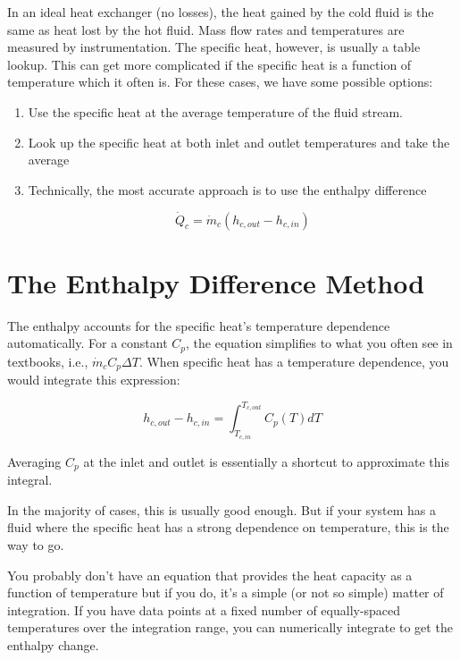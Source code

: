 \documentclass[letterpaper,twocolumn]{article}  %
\begin{document}
	In an ideal heat exchanger (no losses), the heat gained by the cold fluid is the same as heat lost by the hot fluid. Mass flow rates and temperatures are measured by instrumentation. The specific heat, however, is usually a table lookup. This can get more complicated if the specific heat is a function of temperature which it often is. For these cases, we have some possible options:
	
	\begin{enumerate}[label=(\roman*)]
		\item Use the specific heat at the average temperature of the fluid stream.
		
		\item Look up the specific heat at both inlet and outlet temperatures and take the average
		
		\item Technically, the most accurate approach is to use the enthalpy difference
		
		\begin{equation}
			\dot{Q}_c=\dot{m}_c(h_{c,out}-h_{c,in})
		\end{equation}
	\end{enumerate}
	
	\section{The Enthalpy Difference Method}
	The enthalpy accounts for the specific heat's temperature dependence automatically.  For a constant $C_p$, the equation simplifies to what you often see in textbooks, i.e., $\dot{m}_cC_p\Delta T $. When specific heat has a temperature dependence, you would integrate this expression:
	
	\begin{equation}		
		h_{c,out}-h_{c,in} = \int_{T_{c,in}}^{T_{c,out}}C_p(T)dT
	\end{equation}
	
	Averaging $C_p$ at the inlet and outlet is essentially a shortcut to approximate this integral.
	
	In the majority of cases, this is usually good enough. But if your system has a fluid where the specific heat has a strong dependence on temperature, this is the way to go.
	
	You probably don't have an equation that provides the heat capacity as a function of temperature but if you do, it's a simple (or not so simple) matter of integration. If you have data points at a fixed number of equally-spaced temperatures over the integration range, you can numerically integrate to get the enthalpy change.
	
\end{document}
